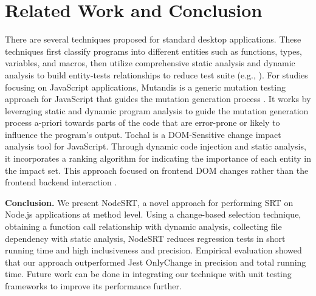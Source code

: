 \documentclass[10pt, conference]{IEEEtran}
\begin{document}
\section{Related Work and Conclusion}
There are several techniques proposed for standard desktop applications. These techniques 
first classify programs into different entities such as functions, types, variables, and macros, then utilize comprehensive static analysis 
and dynamic analysis to build entity-tests relationships to reduce test suite (e.g., \cite{b13, b2, b4,b12,b7, b9,b14, b17}).
For studies focusing on JavaScript applications, Mutandis is a generic mutation testing 
approach for JavaScript that guides the mutation generation process \cite{b11}. It works by leveraging static and dynamic program 
analysis to guide the mutation generation process a-priori towards parts of the code that are error-prone or 
likely to influence the program’s output. 
Tochal is a DOM-Sensitive change impact analysis tool for JavaScript. Through dynamic code injection and static analysis, it 
incorporates a ranking algorithm for indicating the importance of each entity in the impact set. This 
approach focused on frontend DOM changes rather than the frontend backend interaction \cite{b1}.


\textbf{Conclusion.} We present NodeSRT, a novel approach for performing SRT on Node.js applications at method level. Using a change-based selection technique, 
obtaining a function call relationship with dynamic analysis, collecting file dependency with static analysis, NodeSRT reduces regression tests in short running time
and high inclusiveness and precision. Empirical evaluation showed that our approach outperformed Jest OnlyChange in precision and total running time. Future work can 
be done in integrating our technique with unit testing frameworks to improve its performance further.
\end{document}
